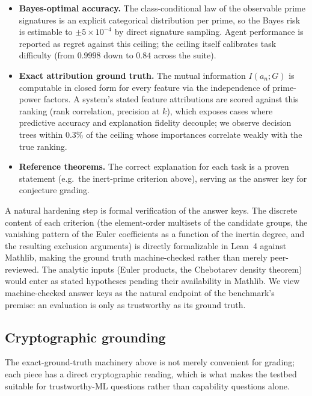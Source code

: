 \documentclass[10pt]{article}
\begin{document}
\begin{itemize}
  \item \textbf{Bayes-optimal accuracy.} The class-conditional law of
  the observable prime signatures is an explicit categorical
  distribution per prime, so the Bayes risk is estimable to
  $\pm 5 \times 10^{-4}$ by direct signature sampling. Agent
  performance is reported as regret against this ceiling; the ceiling
  itself calibrates task difficulty (from $0.9998$ down to $0.84$
  across the suite).
  \item \textbf{Exact attribution ground truth.} The mutual information
  $I(a_n; G)$ is computable in closed form for every feature via the
  independence of prime-power factors. A system's stated feature
  attributions are scored against this ranking (rank correlation,
  precision at $k$), which exposes cases where predictive accuracy and
  explanation fidelity decouple; we observe decision trees within
  $0.3\%$ of the ceiling whose importances correlate weakly with the
  true ranking.
  \item \textbf{Reference theorems.} The correct explanation for each
  task is a proven statement (e.g.\ the inert-prime criterion above),
  serving as the answer key for conjecture grading.
\end{itemize}

A natural hardening step is formal verification of the answer keys.
The discrete content of each criterion (the element-order multisets of
the candidate groups, the vanishing pattern of the Euler coefficients
as a function of the inertia degree, and the resulting exclusion
arguments) is directly formalizable in Lean~4 against Mathlib, making
the ground truth machine-checked rather than merely peer-reviewed. The
analytic inputs (Euler products, the Chebotarev density theorem) would
enter as stated hypotheses pending their availability in Mathlib. We
view machine-checked answer keys as the natural endpoint of the
benchmark's premise: an evaluation is only as trustworthy as its
ground truth.

\subsection*{Cryptographic grounding}

The exact-ground-truth machinery above is not merely convenient for
grading; each piece has a direct cryptographic reading, which is what
makes the testbed suitable for trustworthy-ML questions rather than
capability questions alone.
\end{document}
